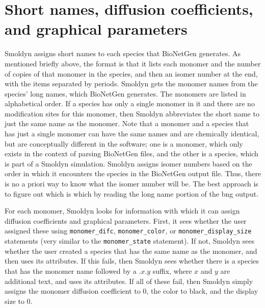 \documentclass {scrbook}
\newcommand {\ttt} {\texttt}
\begin{document}
\section{Short names, diffusion coefficients, and graphical parameters}

Smoldyn assigns short names to each species that BioNetGen generates. As mentioned briefly above, the format is that it lists each monomer and the number of copies of that monomer in the species, and then an isomer number at the end, with the items separated by periods. Smoldyn gets the monomer names from the species' long names, which BioNetGen generates. The monomers are listed in alphabetical order. If a species has only a single monomer in it and there are no modification sites for this monomer, then Smoldyn abbreviates the short name to just the same name as the monomer. Note that a monomer and a species that has just a single monomer can have the same names and are chemically identical, but are conceptually different in the software; one is a monomer, which only exists in the context of parsing BioNetGen files, and the other is a species, which is part of a Smoldyn simulation. Smoldyn assigns isomer numbers based on the order in which it encounters the species in the BioNetGen output file. Thus, there is no a priori way to know what the isomer number will be. The best approach is to figure out which is which by reading the long name portion of the bng output.

For each monomer, Smoldyn looks for information with which it can assign diffusion coefficients and graphical parameters. First, it sees whether the user assigned these using \ttt{monomer\_difc}, \ttt{monomer\_color}, or \ttt{monomer\_display\_size} statements (very similar to the \ttt{monomer\_state} statement). If not, Smoldyn sees whether the user created a species that has the same name as the monomer, and then uses its attributes. If this fails, then Smoldyn sees whether there is a species that has the monomer name followed by a .$x$.$y$ suffix, where $x$ and $y$ are additional text, and uses its attributes. If all of these fail, then Smoldyn simply assigns the monomer diffusion coefficient to 0, the color to black, and the display size to 0.
\end{document}
